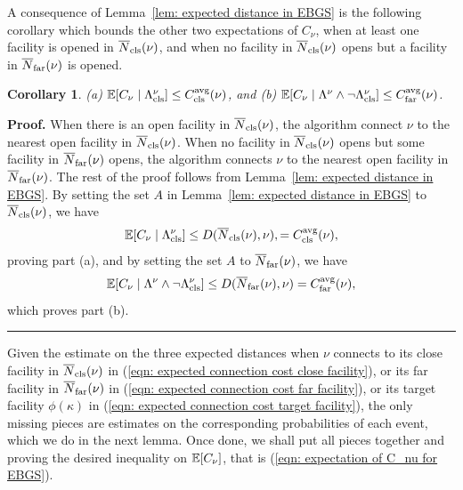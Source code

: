 \documentclass[oneside,final]{ucr}
\newtheorem{corollary}[theorem]{Corollary}
\newenvironment{proof}[1][Proof]{\textbf{#1.} }{\ \rule{0.5em}{0.5em}}
\begin{document}
A consequence of Lemma~\ref{lem: expected distance in EBGS} is the
following corollary which bounds the other two expectations
of $C_\nu$, when at least one facility is opened in ${\overline{N}}_{{\mbox{\scriptsize\rm cls}}}(\nu)$,
and when no facility in ${\overline{N}}_{{\mbox{\scriptsize\rm cls}}}(\nu)$ opens but a facility in
${\overline{N}}_{{\mbox{\scriptsize\rm far}}}(\nu)$ is opened.


\begin{corollary} \label{coro: EBGS close and far distance} 
%
{\rm (a)} $\mathbb{E}[C_{\nu} \mid \Lambda_{{\mbox{\scriptsize\rm cls}}}^\nu] \leq C_{{\mbox{\scriptsize\rm cls}}}^{{\mbox{\scriptsize\rm avg}}}(\nu)$,
and
{\rm (b)} $\mathbb{E}[C_{\nu} \mid \Lambda^\nu \wedge \neg \Lambda_{{\mbox{\scriptsize\rm cls}}}^\nu]
    			\leq C_{{\mbox{\scriptsize\rm far}}}^{{\mbox{\scriptsize\rm avg}}}(\nu)$.
\end{corollary}

\begin{proof}
When there is an open facility in ${\overline{N}}_{{\mbox{\scriptsize\rm cls}}}(\nu)$, the algorithm
  connect $\nu$ to the nearest open facility in
  ${\overline{N}}_{{\mbox{\scriptsize\rm cls}}}(\nu)$. When no facility in ${\overline{N}}_{{\mbox{\scriptsize\rm cls}}}(\nu)$ opens but
  some facility in ${\overline{N}}_{{\mbox{\scriptsize\rm far}}}(\nu)$ opens, the algorithm connects
  $\nu$ to the nearest open facility in ${\overline{N}}_{{\mbox{\scriptsize\rm far}}}(\nu)$. The rest of
  the proof follows from Lemma~\ref{lem: expected distance in
    EBGS}. By setting the set $A$ in Lemma~\ref{lem: expected distance
    in EBGS} to ${\overline{N}}_{{\mbox{\scriptsize\rm cls}}}(\nu)$, we have
%
  \begin{equation*}
    \mathbb{E}[C_{\nu} \mid \Lambda_{{\mbox{\scriptsize\rm cls}}}^\nu] \leq D({\overline{N}}_{{\mbox{\scriptsize\rm cls}}}(\nu), \nu),
    = C_{{\mbox{\scriptsize\rm cls}}}^{{\mbox{\scriptsize\rm avg}}}(\nu),
    \label{eqn: expected connection cost close facility}
  \end{equation*}
% 
proving part (a), and by setting the set $A$ to ${\overline{N}}_{{\mbox{\scriptsize\rm far}}}(\nu)$, we have
%
  \begin{equation*}
    \mathbb{E}[C_{\nu}
    \mid \Lambda^\nu \wedge \neg \Lambda_{{\mbox{\scriptsize\rm cls}}}^\nu] \leq
    D({\overline{N}}_{{\mbox{\scriptsize\rm far}}}(\nu), \nu) = C_{{\mbox{\scriptsize\rm far}}}^{{\mbox{\scriptsize\rm avg}}}(\nu),
    \label{eqn: expected connection cost far facility}
  \end{equation*}
which proves part (b).
\end{proof}

Given the estimate on the three expected distances when $\nu$ connects
to its close facility in ${\overline{N}}_{{\mbox{\scriptsize\rm cls}}}(\nu)$ in (\ref{eqn: expected
  connection cost close facility}), or its far facility in
${\overline{N}}_{{\mbox{\scriptsize\rm far}}}(\nu)$ in (\ref{eqn: expected connection cost far
  facility}), or its target facility $\phi(\kappa)$ in (\ref{eqn:
  expected connection cost target facility}), the only missing pieces
are estimates on the corresponding probabilities of each event, which
we do in the next lemma. Once done, we shall put all pieces together
and proving the desired inequality on $\mathbb{E}[C_{\nu}]$, that is
(\ref{eqn: expectation of C_nu for EBGS}).
\end{document}
